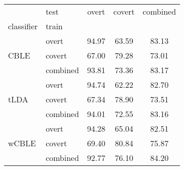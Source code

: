 \begin{tabular}{@{}llccc@{}}
\toprule
 & test & overt & covert & combined \\
classifier & train &  &  &  \\
\midrule
\multirow[t]{3}{*}{CBLE} & overt & 94.97 & 63.59 & 83.13 \\
 & covert & 67.00 & 79.28 & 73.01 \\
 & combined & 93.81 & 73.36 & 83.17 \\
\cline{1-5}
\multirow[t]{3}{*}{tLDA} & overt & 94.74 & 62.22 & 82.70 \\
 & covert & 67.34 & 78.90 & 73.51 \\
 & combined & 94.01 & 72.55 & 83.16 \\
\cline{1-5}
\multirow[t]{3}{*}{wCBLE} & overt & 94.28 & 65.04 & 82.51 \\
 & covert & 69.40 & 80.84 & 75.87 \\
 & combined & 92.77 & 76.10 & 84.20 \\
\cline{1-5}
\bottomrule
\end{tabular}
